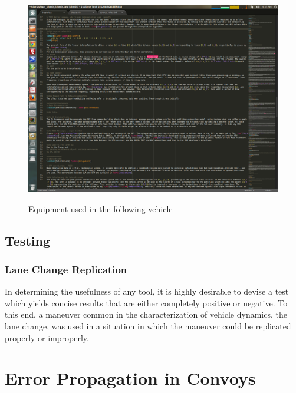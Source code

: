\documentclass[12pt]{report}
\begin{document}
\begin{figure}[ht] \centering \label{fig:hardwarefoll}
    \includegraphics[width=6.5in]{./figs/follower_hardware.png}
    \caption{Equipment used in the following vehicle}
\end{figure}



\section{Testing} \label{sec:test}

\subsection{Lane Change Replication} \label{sec:lanechange}

In determining the usefulness of any tool, it is highly desirable to devise a test which yields concise results that are either completely positive or negative. To this end, a maneuver common in the characterization of vehicle dynamics, the lane change, was used in a situation in which the maneuver could be replicated properly or improperly. 





\chapter{Error Propagation in Convoys}
\label{chap:errprop}
\end{document}

